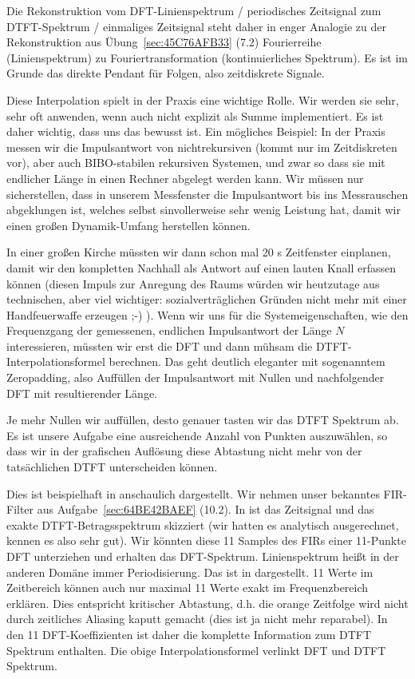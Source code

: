 \begin{Loesung}
Die Rekonstruktion 
vom DFT-Linienspektrum / periodisches Zeitsignal zum
DTFT-Spektrum / einmaliges Zeitsignal steht daher in enger Analogie zu der
Rekonstruktion aus Übung~\ref{sec:45C76AFB33} (7.2) Fourierreihe (Linienspektrum) zu
Fouriertransformation (kontinuierliches Spektrum). Es ist im Grunde das
direkte Pendant für Folgen, also zeitdiskrete Signale.

Diese Interpolation spielt in der Praxis eine wichtige Rolle. Wir werden sie
sehr, sehr oft anwenden, wenn auch nicht explizit als Summe implementiert.
Es ist daher wichtig, dass uns das bewusst ist.
Ein mögliches Beispiel:
In der Praxis messen wir
die Impulsantwort von nichtrekursiven (kommt nur im Zeitdiskreten
vor), aber auch BIBO-stabilen rekursiven Systemen,
und zwar so dass sie mit endlicher Länge in einen Rechner abgelegt werden kann.
%
Wir müssen nur sicherstellen, dass
in unserem Messfenster die Impulsantwort
bis ins Messrauschen abgeklungen ist, welches selbst sinvollerweise sehr wenig
Leistung hat, damit wir einen großen Dynamik-Umfang herstellen können.

In einer großen Kirche müssten wir dann schon mal 20 s Zeitfenster einplanen,
damit wir den kompletten Nachhall als Antwort auf einen lauten Knall erfassen
können (diesen Impuls zur Anregung des Raums würden wir heutzutage aus technischen,
aber viel wichtiger: sozialverträglichen Gründen nicht mehr mit einer Handfeuerwaffe
erzeugen ;-) ).
%
Wenn wir uns für die Systemeigenschaften, wie den Frequenzgang der gemessenen,
endlichen Impulsantwort der Länge $N$ interessieren, müssten wir erst die
DFT und dann mühsam die DTFT-Interpolationsformel berechnen. Das geht deutlich
eleganter mit sogenanntem Zeropadding, also Auffüllen der Impulsantwort mit
Nullen und nachfolgender DFT mit resultierender Länge.

Je mehr Nullen wir auffüllen, desto genauer tasten wir das DTFT Spektrum ab.
Es ist unsere Aufgabe eine ausreichende Anzahl von Punkten auszuwählen,
so dass wir in der grafischen Auflösung diese Abtastung nicht mehr
von der tatsächlichen DTFT unterscheiden können.

Dies ist beispielhaft in  anschaulich dargestellt.
Wir nehmen unser bekanntes FIR-Filter aus Aufgabe~\ref{sec:64BE42BAEF} (10.2).
In  ist das Zeitsignal und das exakte DTFT-Betragsspektrum
skizziert (wir hatten es analytisch ausgerechnet, kennen es also sehr gut).
%
Wir könnten diese 11 Samples des FIRs einer 11-Punkte DFT unterziehen und erhalten
das DFT-Spektrum. Linienspektrum heißt in der anderen Domäne immer Periodisierung.
Das ist in  dargestellt. 11 Werte im Zeitbereich
können auch nur maximal 11 Werte exakt im Frequenzbereich erklären. Dies
entspricht kritischer Abtastung, d.h. die orange Zeitfolge wird nicht durch
zeitliches Aliasing kaputt gemacht (dies ist ja nicht mehr reparabel).
In den 11 DFT-Koeffizienten ist daher die komplette Information zum DTFT
Spektrum enthalten. Die obige Interpolationsformel  
verlinkt DFT und DTFT Spektrum.


\end{Loesung}
